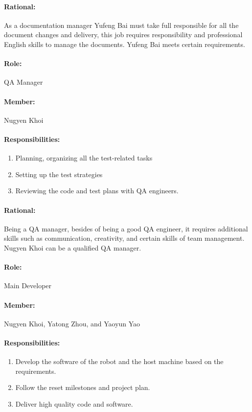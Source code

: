 \documentclass[11pt, a4paper]{report}
\begin{document}
\paragraph{Rational: \\}
As a documentation manager Yufeng Bai must take full responsible for all the document changes and delivery, this job requires responsibility and professional English skills to manage the documents. Yufeng Bai meets certain requirements.

\paragraph{Role: } QA Manager
\paragraph{Member: } Nugyen Khoi
\paragraph{Responsibilities: }
\begin{enumerate}
	\item  Planning, organizing all the test-related tasks
	\item  Setting up the test strategies
	\item  Reviewing the code and test plans with QA engineers.
\end{enumerate}
\paragraph{Rational: \\}
Being a QA manager, besides of being a good QA engineer, it requires additional skills such as communication, creativity, and certain skills of team management. Nugyen Khoi can be a qualified QA manager.

\paragraph{Role: } Main Developer
\paragraph{Member: } Nugyen Khoi, Yatong Zhou, and Yaoyun Yao
\paragraph{Responsibilities: }
\begin{enumerate}
	\item  Develop the software of the robot and the host machine based on the requirements.
	\item  Follow the reset milestones and project plan. 
	\item  Deliver high quality code and software.
\end{enumerate}
\end{document}
